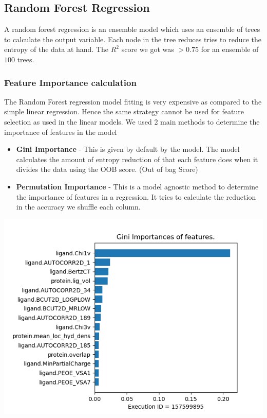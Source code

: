 \documentclass[11pt]{article}
\begin{document}
\subsection{Random Forest Regression}
A random forest regression is an ensemble model which uses an ensemble of trees
to calculate the output variable.
Each node in the tree reduces tries to reduce the entropy of the data at hand.
The $R^2$ score we got was $> 0.75$ for an ensemble of $100$ trees.

\subsubsection{Feature Importance calculation}
The Random Forest regression model fitting is very expensive as compared to the simple linear regression.
Hence the same strategy cannot be used for feature selection as used in the linear models.
We used 2 main methods to determine the importance of features in the model
\begin{itemize}
\item \textbf{Gini Importance} - This is given by default by the model. The model 
calculates the amount of entropy reduction of that each feature does when it divides the data using the OOB score. (Out of bag Score)
\item \textbf{Permutation Importance} - This is a model agnostic method to determine the importance of features in a regression. 
It tries to calculate the reduction in the accuracy we shuffle each column.
\end{itemize}
\includegraphics[scale=0.7]{Gini_importance}
\end{document}
